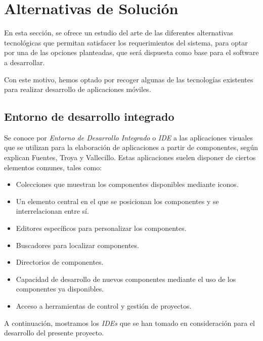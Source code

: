 

\section{Alternativas de Solución}
En esta sección, se ofrece un estudio del arte de las diferentes alternativas tecnológicas que permitan satisfacer 
los requerimientos del sistema, para optar por una de las opciones planteadas, que será dispuesta como base 
para el software a desarrollar.\medskip

Con este motivo, hemos optado por recoger algunas de las tecnologías existentes para realizar desarrollo de aplicaciones 
móviles.

\subsection{Entorno de desarrollo integrado}
Se conoce por \textit{Entorno de Desarrollo Integrado} o \textit{IDE} a las aplicaciones visuales que se utilizan para 
la elaboración de aplicaciones a partir de componentes, según explican Fuentes, Troya y Vallecillo. \autocite*{Fuentes}
Estas aplicaciones suelen disponer de ciertos elementos comunes, tales como:

\begin{itemize}
    \item Colecciones que muestran los componentes disponibles mediante iconos.
    \item Un elemento central en el que se posicionan los componentes y se interrelacionan entre sí.
    \item Editores específicos para personalizar los componentes.
    \item Buscadores para localizar componentes.
    \item Directorios de componentes.
    \item Capacidad de desarrollo de nuevos componentes mediante el uso de los componentes ya disponibles.
    \item Acceso a herramientas de control y gestión de proyectos.
\end{itemize}

A continuación, mostramos los \textit{IDEs} que se han tomado en consideración para el desarrollo del presente proyecto.

